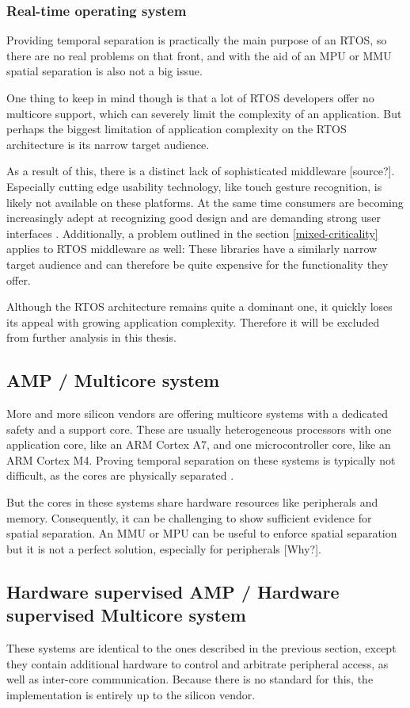 \subsubsection{Real-time operating system}
Providing temporal separation is practically the main purpose of an RTOS, so there are no real problems on that front, and with the aid of an \gls{MPU} or \gls{MMU} spatial separation is also not a big issue.

One thing to keep in mind though is that a lot of RTOS developers offer no multicore support, which can severely limit the complexity of an application. But perhaps the biggest limitation of application complexity on the RTOS architecture is its narrow target audience.

As a result of this, there is a distinct lack of sophisticated middleware [source?]. Especially cutting edge usability technology, like touch gesture recognition, is likely not available on these platforms. At the same time consumers are becoming increasingly adept at recognizing good design and are demanding strong user interfaces \cite{HBR.September2015}.
Additionally, a problem outlined in the section \ref{mixed-criticality} applies to RTOS middleware as well: These libraries have a similarly narrow target audience and can therefore be quite expensive for the functionality they offer.

Although the RTOS architecture remains quite a dominant one, it quickly loses its appeal with growing application complexity. Therefore it will be excluded from further analysis in this thesis.
\subsection{AMP / Multicore system}
More and more silicon vendors are offering multicore systems with a dedicated safety and a support core. These are usually heterogeneous processors with one application core, like an ARM Cortex A7, and one microcontroller core, like an ARM Cortex M4. Proving temporal separation on these systems is typically not difficult, as the cores are physically separated \cite{Wittenstein.temporal.2017}.

But the cores in these systems share hardware resources like peripherals and memory. Consequently, it can be challenging to show sufficient evidence for spatial separation. An \gls{MMU} or \gls{MPU} can be useful to enforce spatial separation but it is not a perfect solution, especially for peripherals [Why?]. 
\subsection{Hardware supervised AMP / Hardware supervised Multicore system}
These systems are identical to the ones described in the previous section, except they contain additional hardware to control and arbitrate peripheral access, as well as inter-core communication.
Because there is no standard for this, the implementation is entirely up to the silicon vendor. 

